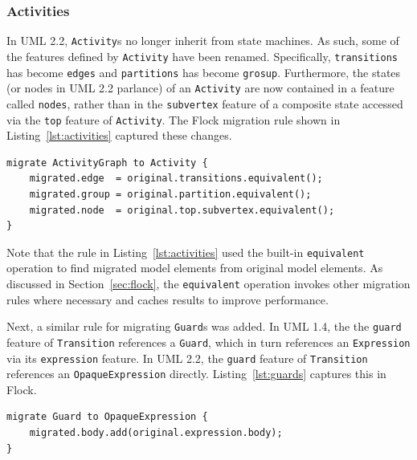 \subsubsection{Activities}
In UML 2.2, \texttt{Ac\-ti\-vi\-ty}s no longer inherit from state machines. As such, some of the features defined by \texttt{Ac\-ti\-vi\-ty} have been renamed. Specifically, \texttt{tr\-an\-si\-ti\-o\-ns} has become \texttt{ed\-g\-es} and \texttt{par\-ti\-ti\-o\-ns} has become \texttt{gr\-o\-sup}. Furthermore, the states (or nodes in UML 2.2 parlance) of an \texttt{Ac\-ti\-vi\-ty} are now contained in a feature called \texttt{nodes}, rather than in the \texttt{su\-bv\-er\-t\-ex} feature of a composite state accessed via the \texttt{top} feature of \texttt{Ac\-ti\-vi\-ty}. The Flock migration rule shown in Listing~\ref{lst:activities} captured these changes.

\begin{lstlisting}[caption=Migrating ActivityGraphs, label=lst:activities, language=Flock]
migrate ActivityGraph to Activity {
	migrated.edge  = original.transitions.equivalent();
	migrated.group = original.partition.equivalent();
	migrated.node  = original.top.subvertex.equivalent();
}
\end{lstlisting}

Note that the rule in Listing~\ref{lst:activities} used the built-in \texttt{eq\-ui\-va\-le\-nt} operation to find migrated model elements from original model elements. As discussed in Section~\ref{sec:flock}, the \texttt{equ\-iv\-al\-e\-nt} operation invokes other migration rules where necessary and caches results to improve performance.

Next, a similar rule for migrating \texttt{Gu\-ar\-d}s was added. In UML 1.4, the the \texttt{gu\-a\-rd} feature of \texttt{Tr\-an\-si\-ti\-on} references a \texttt{Gu\-a\-rd}, which in turn references an \texttt{Ex\-pr\-es\-si\-on} via its \texttt{ex\-pr\-es\-si\-on} feature. In UML 2.2, the \texttt{gu\-a\-rd} feature of \texttt{Tr\-an\-si\-ti\-on} references an \texttt{Op\-aq\-ueEx\-pr\-es\-si\-on} directly. Listing~\ref{lst:guards} captures this in Flock.

\begin{lstlisting}[caption=Migrating Guards, label=lst:guards, language=Flock]
migrate Guard to OpaqueExpression {
	migrated.body.add(original.expression.body);
}

\end{lstlisting}


